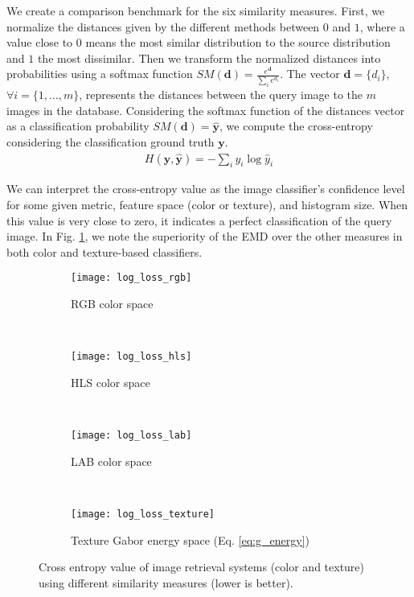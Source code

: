 We create a comparison benchmark for the six similarity measures. First, we normalize the distances given by the different methods between $0$ and $1$, where a value close to $0$ means the most similar distribution to the source distribution and $1$ the most dissimilar. Then we transform the normalized distances into probabilities using a softmax function $SM(\mathbf{d}) = \frac{e^{\mathbf{d}}}{\sum_{i}e^{d_i}}$. The vector $\mathbf{d}=\{d_i\}$, $\forall i=\{1, \ldots, m\}$, represents the distances between the query image to the $m$ images in the database. Considering the softmax function of the distances vector as a classification probability $SM(\mathbf{d})=\mathbf{\hat{y}}$,  we compute the cross-entropy \citep{Bishop:BOOK:2006} considering the classification ground truth $\mathbf{y}$. 
\begin{eqnarray}
H(\mathbf{y}, \mathbf{\hat{y}}) = - \sum\nolimits_{i}{y_i}\log \hat{y}_i
\label{eq:cross-entropy}
\end{eqnarray}

We can interpret the cross-entropy value as the image classifier's confidence level for some given metric, feature space (color or texture), and histogram size. When this value is very close to zero, it indicates a perfect classification of the query image. In Fig. \ref{fig:cross_entropy}, we note the superiority of the EMD over the other measures in both color and texture-based classifiers.

\begin{figure}[ht]
    \centering
    \begin{subfigure}[b]{0.48\textwidth}
		\centering
		\texttt{[image: log\_loss\_rgb]}	
		\caption{RGB color space}
	\end{subfigure}
    ~ %
    \begin{subfigure}[b]{0.48\textwidth}
		\centering
		\texttt{[image: log\_loss\_hls]}	
		\caption{HLS color space}
	\end{subfigure}\\[2ex]
	
	
    \begin{subfigure}[b]{0.48\textwidth}
		\centering
		\texttt{[image: log\_loss\_lab]}	
		\caption{LAB color space}
	\end{subfigure}   
    ~ %
    \begin{subfigure}[b]{0.48\textwidth}
		\centering
		\texttt{[image: log\_loss\_texture]}	
		\caption{Texture Gabor energy space (Eq. \eqref{eq:g_energy})}
	\end{subfigure}  
		
	\caption{Cross entropy value of image retrieval systems (color and texture) using different similarity measures (lower is better).}
	\label{fig:cross_entropy}
\end{figure}

